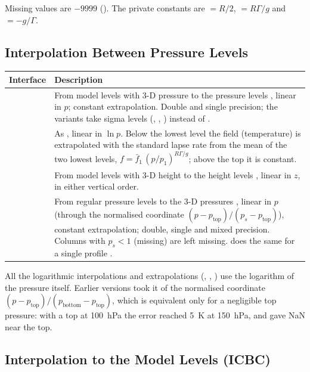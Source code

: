 Missing values are $-9999$ (). The private constants are
 $= R/2$,  $= R\Gamma/g$ and  $= -g/\Gamma$.

\subsection{Interpolation Between Pressure Levels}

\begin{longtable}{L{4.5cm} L{9.5cm}}
  \toprule
  \textbf{Interface} & \textbf{Description} \\
  \midrule
  \endhead
  \bottomrule
  \endfoot
   &
    From model levels with 3-D pressure  to the pressure levels
    , linear in $p$; constant extrapolation. Double and single
    precision; the  variants take sigma levels (,
    , ) instead of . \\
   &
    As , linear in $\ln p$. Below the lowest level the field
    (temperature) is extrapolated with the standard lapse rate from the
    mean of the two lowest levels,
    $f = \bar f_1\,(p/p_1)^{R\Gamma/g}$; above the top it is constant. \\
   &
    From model levels with 3-D height  to the height levels
    , linear in $z$, in either vertical order. \\
   &
    From regular pressure levels  to the 3-D pressures ,
    linear in $p$ (through the normalised coordinate
    $(p - p_\text{top})/(p_s - p_\text{top})$), constant extrapolation;
    double, single and mixed precision. Columns with $p_s < 1$ (missing)
    are left missing.  does the same for
    a single profile . \\
\end{longtable}

\noindent All the logarithmic interpolations and extrapolations
(, , ) use the logarithm of the
pressure itself. Earlier versions took it of the normalised coordinate
$(p - p_\text{top})/(p_\text{bottom} - p_\text{top})$, which is equivalent
only for a negligible top pressure: with a top at 100~hPa the error reached
5~K at 150~hPa, and  gave NaN near the top.

\subsection{Interpolation to the Model Levels (ICBC)}

